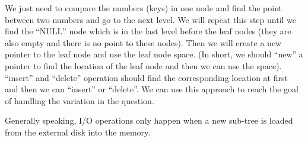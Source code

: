 


\def\HWTITLE{Assignment 8}
\def\COURSECODE{CS 225: Data Structures}
\def\AUTHOR{Group D1}



\makeMyTitle

\thispagestyle{empty}
\begin{questions}
    We just need to compare the numbers (keys) in one node and find the point between two numbers and go to the next level. We will repeat this step until we find the ``NULL'' node which is in the last level before the leaf nodes (they are also empty and there is no point to these nodes). Then we will create a new pointer to the leaf node and use the leaf node space. (In short, we should “new” a pointer to find the location of the leaf node and then we can use the space). ``insert'' and ``delete'' operation should find the corresponding location at first and then we can ``insert'' or ``delete''. We can use this approach to reach the goal of handling the variation in the question.

    Generally speaking, I/O operations only happen when a new sub-tree is loaded from the external disk into the memory.

\end{questions}
